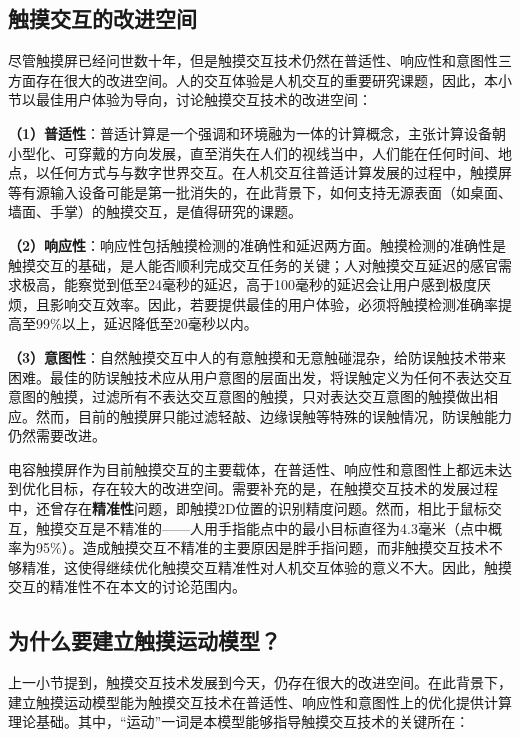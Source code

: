 \subsection{触摸交互的改进空间}

尽管触摸屏已经问世数十年，但是触摸交互技术仍然在普适性、响应性和意图性三方面存在很大的改进空间。人的交互体验是人机交互的重要研究课题，因此，本小节以最佳用户体验为导向，讨论触摸交互技术的改进空间：

\textbf{（1）普适性}：普适计算是一个强调和环境融为一体的计算概念，主张计算设备朝小型化、可穿戴的方向发展，直至消失在人们的视线当中，人们能在任何时间、地点，以任何方式与与数字世界交互。在人机交互往普适计算发展的过程中，触摸屏等有源输入设备可能是第一批消失的，在此背景下，如何支持无源表面（如桌面、墙面、手掌）的触摸交互，是值得研究的课题。

\textbf{（2）响应性}：响应性包括触摸检测的准确性和延迟两方面。触摸检测的准确性是触摸交互的基础，是人能否顺利完成交互任务的关键；人对触摸交互延迟的感官需求极高，能察觉到低至24毫秒的延迟\cite{jota2013fast}，高于100毫秒的延迟会让用户感到极度厌烦\cite{miller1968response}，且影响交互效率\cite{jota2013fast, ng2012designing}。因此，若要提供最佳的用户体验，必须将触摸检测准确率提高至99\%以上，延迟降低至20毫秒以内。

\textbf{（3）意图性}：自然触摸交互中人的有意触摸和无意触碰混杂，给防误触技术带来困难。最佳的防误触技术应从用户意图的层面出发，将误触定义为任何不表达交互意图的触摸，过滤所有不表达交互意图的触摸，只对表达交互意图的触摸做出相应。然而，目前的触摸屏只能过滤轻敲、边缘误触等特殊的误触情况，防误触能力仍然需要改进。

电容触摸屏作为目前触摸交互的主要载体，在普适性、响应性和意图性上都远未达到优化目标，存在较大的改进空间。需要补充的是，在触摸交互技术的发展过程中，还曾存在\textbf{精准性}问题，即触摸2D位置的识别精度问题。然而，相比于鼠标交互，触摸交互是不精准的——人用手指能点中的最小目标直径为4.3毫米（点中概率为95\%）。造成触摸交互不精准的主要原因是胖手指问题\cite{yi2017too}，而非触摸交互技术不够精准，这使得继续优化触摸交互精准性对人机交互体验的意义不大。因此，触摸交互的精准性不在本文的讨论范围内。

\subsection{为什么要建立触摸运动模型？}

上一小节提到，触摸交互技术发展到今天，仍存在很大的改进空间。在此背景下，建立触摸运动模型能为触摸交互技术在普适性、响应性和意图性上的优化提供计算理论基础。其中，“运动”一词是本模型能够指导触摸交互技术的关键所在：

